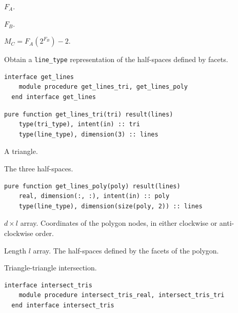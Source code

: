 \documentclass{article}
\begin{document}
\begin{description}[font=\ttfamily\bfseries,leftmargin=2.2\parindent,labelindent=1.7\parindent,noitemsep]
  \item[n\_lines\_a] $F_A$.
  \item[n\_lines\_b] $F_B$.
  \item[max\_n\_tris\_c] $M_C = F_A \left( 2^{F_B} \right) - 2$.
\end{description}

\noindent Obtain a \verb+line_type+ representation of the half-spaces defined by
facets.

\begin{lstlisting}[language=FORTRAN]
  interface get_lines
    module procedure get_lines_tri, get_lines_poly
  end interface get_lines
\end{lstlisting} 

\begin{lstlisting}[language=FORTRAN]
  pure function get_lines_tri(tri) result(lines)
    type(tri_type), intent(in) :: tri
    type(line_type), dimension(3) :: lines
\end{lstlisting}

\begin{description}[font=\ttfamily\bfseries,leftmargin=2.2\parindent,labelindent=1.7\parindent,noitemsep]
  \item[tri] A triangle.
  \item[lines] The three half-spaces.
\end{description}

\begin{lstlisting}[language=FORTRAN]
  pure function get_lines_poly(poly) result(lines)
    real, dimension(:, :), intent(in) :: poly    
    type(line_type), dimension(size(poly, 2)) :: lines
\end{lstlisting}

\begin{description}[font=\ttfamily\bfseries,leftmargin=2.2\parindent,labelindent=1.7\parindent,noitemsep]
  \item[poly] $d \times l$ array. Coordinates of the polygon nodes, in either
    clockwise or anti-clockwise order.
  \item[lines] Length $l$ array. The half-spaces defined by the facets of the
    polygon.
\end{description}

\noindent Triangle-triangle intersection.

\begin{lstlisting}[language=FORTRAN]
  interface intersect_tris
    module procedure intersect_tris_real, intersect_tris_tri
  end interface intersect_tris
\end{lstlisting}
\end{document}
